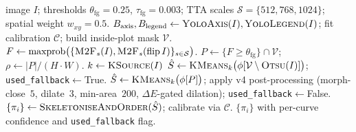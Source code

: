 \documentclass{article}
\begin{document}
\begin{algorithm}[h]
\caption{The MatDeplot Stage~3 line-extractor on a single chart
image.}\label{alg:pipeline}
\begin{algorithmic}[1]
\Require image $I$; thresholds
$\theta_{\mathrm{fg}}{=}0.25$, $\tau_{\mathrm{fg}}{=}0.003$;
TTA scales $\mathcal{S}{=}\{512,768,1024\}$; spatial weight
$w_{xy}{=}0.5$.
\State $B_{\mathrm{axis}}, B_{\mathrm{legend}} \gets \textsc{YoloAxis}(I), \textsc{YoloLegend}(I)$;
fit calibration $\mathcal{C}$; build inside-plot mask $\mathcal{V}$.
\State $F \gets \mathrm{maxprob}\bigl(\{\textsc{M2F}_s(I), \textsc{M2F}_s(\mathrm{flip}\,I)\}_{s\in\mathcal{S}}\bigr)$.
\State $P \gets \{F\geq\theta_{\mathrm{fg}}\}\cap\mathcal{V}$;
$\rho \gets |P|/(H\cdot W)$.
\State $k \gets \textsc{KSource}(I)$
  \State $\hat S \gets \textsc{KMeans}_k\bigl(\phi[\mathcal{V}\setminus\textsc{Otsu}(I)]\bigr)$;
  \texttt{used\_fallback}$\gets$True.
\Else
  \State $\hat S \gets \textsc{KMeans}_k\bigl(\phi[P]\bigr)$;
  apply v4 post-processing
  (morph-close~$5$, dilate~$3$, min-area~$200$, $\Delta E$-gated dilation);
  \texttt{used\_fallback}$\gets$False.
\EndIf
\State $\{\pi_i\} \gets \textsc{SkeletoniseAndOrder}(\hat S)$;
calibrate via $\mathcal{C}$.
\State \Return $\{\pi_i\}$ with per-curve confidence and
\texttt{used\_fallback} flag.
\end{algorithmic}
\end{algorithm}
\end{document}
